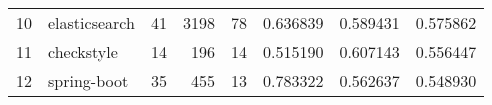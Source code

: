 \begin{tabular}{llrrrrrr}
10 &      elasticsearch &                         41 &                       3198 &                                 78 &                    0.636839 &                 0.589431 &             0.575862 \\
11 &         checkstyle &                         14 &                        196 &                                 14 &                    0.515190 &                 0.607143 &             0.556447 \\
12 &        spring-boot &                         35 &                        455 &                                 13 &                    0.783322 &                 0.562637 &             0.548930 \\
\bottomrule
\end{tabular}
